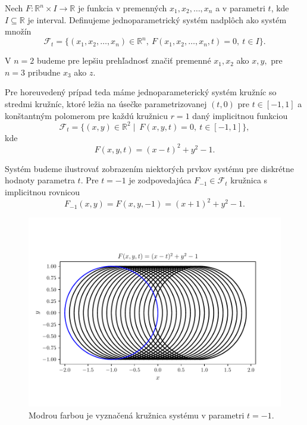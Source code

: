 \begin{definition}
Nech $F \colon \mathbb{R}^{n} \times I \rightarrow \mathbb{R}$ je funkcia v premenných $ x_{1}, x_{2}, \ldots, x_{n} $ a v parametri $t$, kde $I \subseteq \mathbb{R}$ je interval. Definujeme jednoparametrický systém nadplôch ako systém množín 
$$
\mathcal{F}_{t} = \{ (x_{1}, x_{2}, \ldots, x_{n}) \in \mathbb{R}^{n}, \ F(x_{1}, x_{2}, \ldots, x_{n}, t) = 0, \ t \in I \}.
$$
\end{definition}

V $n = 2$ budeme pre lepšiu prehľadnosť značiť premenné $x_{1}, x_{2}$ ako $x, y,$ pre $n = 3$ pribudne $x_{3}$ ako $z.$

Pre horeuvedený prípad teda máme jednoparameterický systém kružníc so stredmi kružníc, ktoré ležia na úsečke parametrizovanej $(t,0)$ pre $t \in [-1,1]$ a konštantným polomerom pre každú kružnicu $r = 1$ daný implicitnou funkciou
$$ \mathcal{F}_{t} = \{ (x, y) \in \mathbb{R}^{2} \mid \ F(x, y, t) = 0, \ t \in [-1,1] \}, $$
kde
$$ F(x, y, t) = (x - t)^2 + y^2 - 1.$$

Systém budeme ilustrovať zobrazením niektorých prvkov systému pre diskrétne hodnoty parametra $t$. Pre $t = -1$ je zodpovedajúca $F_{-1} \in \mathcal{F}_{t}$  kružnica s implicitnou rovnicou
$$ F_{-1}(x, y) = F(x, y, -1) = (x + 1)^2 + y^2 - 1. $$

\begin{figure}[H]
	\centering
	\includegraphics{images/one_element_of_system.pdf}
	\caption{Modrou farbou je vyznačená kružnica systému v parametri $t=-1$.}
	\label{fig:one_element_of_system}
\end{figure}

